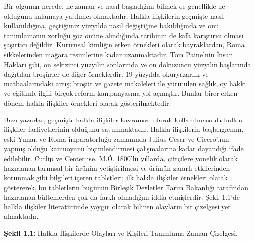 \documentclass[
]{book}
\begin{document}
Bir olgunun nerede, ne zaman ve nasıl başladığını bilmek de genellikle ne olduğunu anlamaya yardımcı olmaktadır. Halkla ilişkilerin geçmişte nasıl kullanıldığına, geçtiğimiz yüzyılda nasıl değiştiğine bakıldığında ve onu tanımlamanın zorluğu göz önüne alındığında tarihinin de kafa karıştırıcı olması şaşırtıcı değildir. Kurumsal kimliğin erken örnekleri olarak bayraklardan, Roma sikkelerinden mağara resimlerine kadar uzanmaktadır. Tom Paine'nin İnsan Hakları gibi, on sekizinci yüzyılın sonlarında ve on dokuzuncu yüzyılın başlarında dağıtılan broşürler de diğer örneklerdir. 19 yüzyılda okuryazarlık ve matbaalarındaki artış; broşür ve gazete makaleleri ile yürütülen sağlık, oy hakkı ve eğitimle ilgili birçok reform kampanyasına yol açmıştır. Bunlar birer erken dönem halkla ilişkiler örnekleri olarak gösterilmektedir. \citep{theaker2016public}

Bazı yazarlar, geçmişte halkla ilişkiler kavramsal olarak kullanılmasa da halkla ilişkiler faaliyetlerinin olduğunu savunmaktadır. Halkla ilişkilerin başlangıcının, eski Yunan ve Roma imparatorluğu zamanında Julius Cesar ve Cicero'nun yapmış olduğu kamuoyunu biçimlendirmesi çalışmalarına kadar dayandığı ifade edilebilir. Cutlip ve Center ise, M.Ö. 1800'lü yıllarda, çiftçilere yönelik olarak hazırlanan tarımsal bir ürünün yetiştirilmesi ve ürünün zararlı etkilerinden korunmak gibi bilgileri içeren tabletleri; ilk halkla ilişkiler örnekleri olarak göstererek, bu tabletlerin bugünün Birleşik Devletler Tarım Bakanlığı tarafından hazırlanan bültenlerden çok da farklı olmadığını iddia etmişlerdir.\citep{peltekoglu2016halkla} Şekil 1.1'de halkla ilişkiler literatüründe yaygın olarak bilinen olayların bir çizelgesi yer almaktadır.

\textbf{Şekil 1.1:} Halkla İlişkilerde Olayları ve Kişileri Tanımlama Zaman Çizelgesi.
\end{document}
